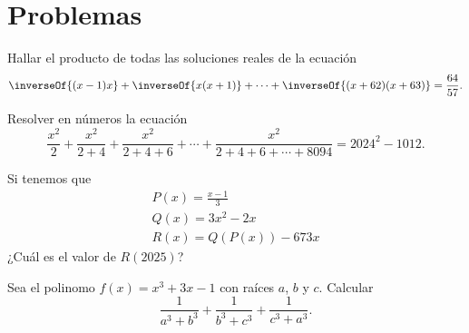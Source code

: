 \section{\large Problemas}

\begin{section-problem}
    Hallar el producto de todas las soluciones reales de la ecuación
    \[
        \inverseOf{(x - 1)x} + \inverseOf{x(x + 1)} + \cdots + \inverseOf{(x + 62)(x + 63)} = \frac{64}{57}.
    \]
\end{section-problem}


\begin{section-problem}
    Resolver en números la ecuación
    \[
        \frac{x^2}{2} + \frac{x^2}{2 + 4} + \frac{x^2}{2 + 4 + 6} + \cdots + \frac{x^2}{2 + 4 + 6 + \cdots + 8094} = 2024^2 - 1012.
    \]
\end{section-problem}

\begin{section-problem}
    Si tenemos que
    \begin{align*}
        P(x) = \frac{x - 1}{3} \\
        Q(x) = 3x^2 - 2x \\
        R(x) = Q\left(P(x)\right) - 673x
    \end{align*}
    ¿Cuál es el valor de $R(2025)$?
\end{section-problem}

\begin{section-problem}
    Sea el polinomo $f(x) = x^3 + 3x - 1$ con raíces $a$, $b$ y $c$.
    Calcular
    \[
        \frac{1}{a^3 + b^3} + \frac{1}{b^3 + c^3} + \frac{1}{c^3 + a^3}.
    \]
\end{section-problem}
